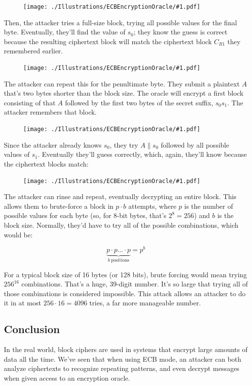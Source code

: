\documentclass[11pt,ebook,table,dvipsnames]{memoir}
\begin{document}
\newcommand{\ecbencoracleimg}[1]{
\begin{figure}[ht!]
\centering
\texttt{[image: ./Illustrations/ECBEncryptionOracle/\#1.pdf]}
\end{figure}
}

\ecbencoracleimg{RememberFirst}

Then, the attacker tries a full-size block, trying all possible values
for the final byte. Eventually, they'll find the value of $s_0$; they
know the guess is correct because the resulting ciphertext block will
match the ciphertext block $C_{R1}$ they remembered earlier.

\ecbencoracleimg{GuessFirst}

The attacker can repeat this for the penultimate byte. They submit a
plaintext $A$ that's two bytes shorter than the block size. The oracle
will encrypt a first block consisting of that $A$ followed by the
first two bytes of the secret suffix, $s_0s_1$. The attacker remembers
that block.

\ecbencoracleimg{RememberSecond}

Since the attacker already knows $s_0$, they try $A \|
s_0$ followed by all possible values of $s_1$. Eventually they'll
guess correctly, which, again, they'll know because the ciphertext
blocks match:

\ecbencoracleimg{GuessSecond}

The attacker can rinse and repeat, eventually decrypting an entire
block. This allows them to brute-force a block in $p \cdot b$
attempts, where $p$ is the number of possible values for each byte
(so, for 8-bit bytes, that's $2^8 = 256$) and $b$ is the block size.
Normally, they'd have to try all of the possible combinations, which
would be:

\[
\underbrace{p \cdot p \ldots \cdot p}_{b \ \mathrm{positions}} = p^b
\]

For a typical block size of 16 bytes (or 128 bits), brute forcing
would mean trying $256^{16}$ combinations. That's a huge, 39-digit
number. It's so large that trying all of those combinations is
considered impossible. This attack allows an attacker to do it in at
most $256 \cdot 16 = 4096$ tries, a far more manageable number.
\subsection{Conclusion}
\label{sec-2-3-2-4}

In the real world, block ciphers are used in systems that encrypt
large amounts of data all the time. We've seen that when using
\gls{ECB mode}, an attacker can both analyze ciphertexts to recognize
repeating patterns, and even decrypt messages when given access to an
\gls{encryption oracle}.
\end{document}
